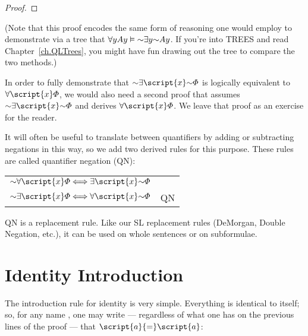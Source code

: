 \begin{proof}
	 
	\open
		\open
			\open
			\close
		\close
	\close
\end{proof}

(Note that this proof encodes the same form of reasoning one would employ to demonstrate via a tree that $\qt{\forall}{y} Ay \models \enot \qt{\exists}{y} \enot Ay$. If you're into TREES and read Chapter~\ref{ch.QLTrees}, you might have fun drawing out the tree to compare the two methods.)

In order to fully demonstrate that $\enot\qt{\exists}{\script{x}}\enot\metaA{}$ is logically equivalent to $\qt{\forall}{\script{x}}\metaA{}$, we would also need a second proof that assumes $\enot\qt{\exists}{\script{x}}\enot\metaA{}$ and derives $\qt{\forall}{\script{x}}\metaA{}$. We leave that proof as an exercise for the reader.

It will often be useful to translate between quantifiers by adding or subtracting negations in this way, so we add two derived rules for this purpose. These rules are called quantifier negation (QN):
\begin{center}
\begin{tabular}{rl}
$\enot\qt{\forall}{\script{x}}\metaA{} \Longleftrightarrow \qt{\exists}{\script{x}}\enot\metaA{}$\\
$\enot\qt{\exists}{\script{x}}\metaA{} \Longleftrightarrow \qt{\forall}{\script{x}}\enot\metaA{}$
& QN
\end{tabular}
\end{center}
QN is a replacement rule. Like our SL replacement rules (DeMorgan, Double Negation, etc.), it can be used on whole sentences or on subformulae.

\section{Identity Introduction}

The introduction rule for identity is very simple. Everything is identical to itself; so, for any name , one may write --- regardless of what one has on the previous lines of the proof --- that $\script{a}{=}\script{a}$:

